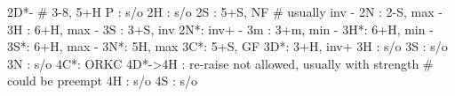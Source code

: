 2D*- # 3-8, 5+H
P  : s/o
2H : s/o
2S : 5+S, NF  # usually inv
   - 2N : 2-S, max
   - 3H : 6+H, max
   - 3S : 3+S, inv
2N*: inv+
   - 3m : 3+m, min
   - 3H*: 6+H, min
   - 3S*: 6+H, max
   - 3N*: 5H, max
3C*: 5+S, GF
3D*: 3+H, inv+
3H : s/o
3S : s/o
3N : s/o
4C*: ORKC
4D*->4H : re-raise not allowed, usually with strength  # could be preempt
4H : s/o
4S : s/o
